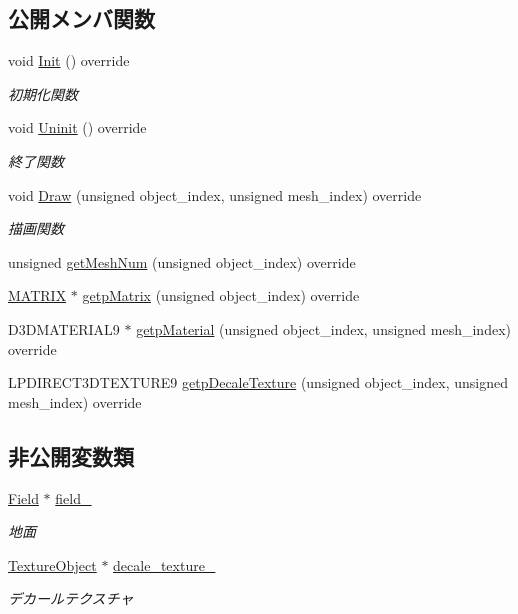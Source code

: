 \subsection*{公開メンバ関数}
\begin{DoxyCompactItemize}
\item 
void \mbox{\hyperlink{class_field_draw_a4287d2ce33033b2413c1d3a81b173373}{Init}} () override
\begin{DoxyCompactList}\small\item\em 初期化関数 \end{DoxyCompactList}\item 
void \mbox{\hyperlink{class_field_draw_a89a78212c141714d9e39e25e663aaeff}{Uninit}} () override
\begin{DoxyCompactList}\small\item\em 終了関数 \end{DoxyCompactList}\item 
void \mbox{\hyperlink{class_field_draw_a1915497654d079074dbd3e058db06a78}{Draw}} (unsigned object\+\_\+index, unsigned mesh\+\_\+index) override
\begin{DoxyCompactList}\small\item\em 描画関数 \end{DoxyCompactList}\item 
unsigned \mbox{\hyperlink{class_field_draw_a0894ddd73716f0db8ceed4b7d89f23fd}{get\+Mesh\+Num}} (unsigned object\+\_\+index) override
\item 
\mbox{\hyperlink{_vector3_d_8h_a032295cd9fb1b711757c90667278e744}{M\+A\+T\+R\+IX}} $\ast$ \mbox{\hyperlink{class_field_draw_ad399978201f737f4c0dd2b3990fa6b34}{getp\+Matrix}} (unsigned object\+\_\+index) override
\item 
D3\+D\+M\+A\+T\+E\+R\+I\+A\+L9 $\ast$ \mbox{\hyperlink{class_field_draw_a5ed29c14e0013513d72f79f8651db805}{getp\+Material}} (unsigned object\+\_\+index, unsigned mesh\+\_\+index) override
\item 
L\+P\+D\+I\+R\+E\+C\+T3\+D\+T\+E\+X\+T\+U\+R\+E9 \mbox{\hyperlink{class_field_draw_a77cef7390fbe8fc68c0b325f4fcc839f}{getp\+Decale\+Texture}} (unsigned object\+\_\+index, unsigned mesh\+\_\+index) override
\end{DoxyCompactItemize}
\subsection*{非公開変数類}
\begin{DoxyCompactItemize}
\item 
\mbox{\hyperlink{class_field}{Field}} $\ast$ \mbox{\hyperlink{class_field_draw_a5d81171db83ea98a33c0e6f68b5dd351}{field\+\_\+}}
\begin{DoxyCompactList}\small\item\em 地面 \end{DoxyCompactList}\item 
\mbox{\hyperlink{class_texture_object}{Texture\+Object}} $\ast$ \mbox{\hyperlink{class_field_draw_a1d9e36a7e8d6dd8791d2dd82bceac28f}{decale\+\_\+texture\+\_\+}}
\begin{DoxyCompactList}\small\item\em デカールテクスチャ \end{DoxyCompactList}\end{DoxyCompactItemize}
